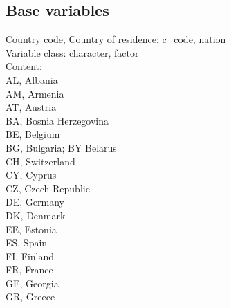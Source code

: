 \documentclass[preprint,12pt,authoryear]{elsarticle}
\begin{document}
\subsection{Base variables}
Country code, Country of residence: c\_code, nation \\ \noindent\hspace*{10mm}%
	Variable class: character, factor \\ \noindent\hspace*{10mm}%
	Content: \\ \noindent\hspace*{20mm}%
		AL, Albania\\ \noindent\hspace*{20mm}%
		AM, Armenia\\ \noindent\hspace*{20mm}%
		AT, Austria\\ \noindent\hspace*{20mm}%
		BA, Bosnia Herzegovina\\ \noindent\hspace*{20mm}%
		BE, Belgium\\ \noindent\hspace*{20mm}%
		BG, Bulgaria; BY Belarus\\ \noindent\hspace*{20mm}%
		CH, Switzerland\\ \noindent\hspace*{20mm}%
		CY, Cyprus\\ \noindent\hspace*{20mm}%
		CZ, Czech Republic\\ \noindent\hspace*{20mm}%
		DE, Germany\\ \noindent\hspace*{20mm}%
		DK, Denmark\\ \noindent\hspace*{20mm}%
		EE, Estonia\\ \noindent\hspace*{20mm}%
		ES, Spain\\ \noindent\hspace*{20mm}%
		FI, Finland\\ \noindent\hspace*{20mm}%
		FR, France\\ \noindent\hspace*{20mm}%
		GE, Georgia\\ \noindent\hspace*{20mm}%
		GR, Greece\\ \noindent\hspace*{20mm}%
\end{document}
